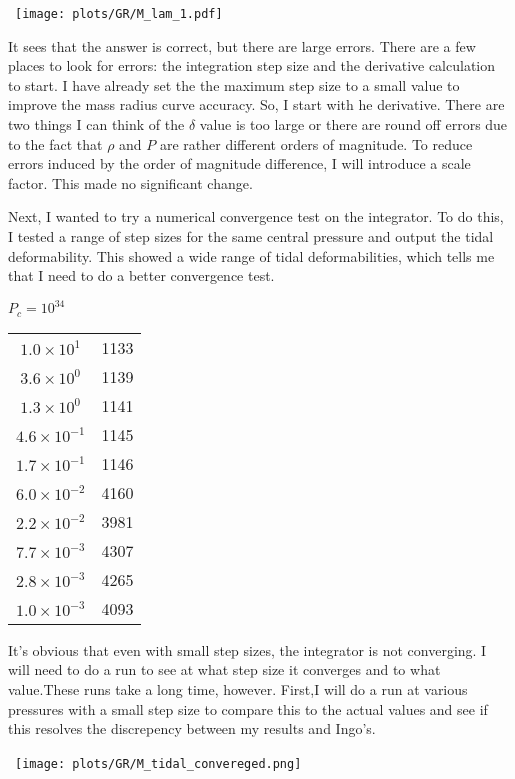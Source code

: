 \documentclass[11pt]{article}
\numberwithin{equation}{section}
\begin{document}
\begin{center}
\hbox{
\texttt{[image: plots/GR/M\_lam\_1.pdf]}}
\end{center}

It sees that the answer is correct, but there are large errors.  There are a few places to look for errors: the integration step size and the derivative calculation to start. I have already set the the maximum step size to a small value to improve the mass radius curve accuracy.  So, I start with he derivative.  There are two things I can think of the $\delta$ value is too large or there are round off errors due to the fact that $\rho$ and $P$ are rather different orders of magnitude.  To reduce errors induced by the order of magnitude difference, I will introduce a scale factor.   This made no significant change.

Next, I wanted to try a numerical convergence test on the integrator.   To do this, I tested a range of step sizes for the same central pressure and output the tidal deformability.  This showed a wide range of tidal deformabilities, which tells me that I need to do a better convergence test.  

$P_{c} = 10^{34}$
\begin{tabular}{|c | c|} \hline
$1.0 \times 10^1$ & 1133 \\ 
$3.6 \times 10^0$ & 1139 \\
$1.3 \times 10^0$ & 1141 \\
$4.6 \times 10^{-1}$ &  1145 \\
$1.7 \times 10^{-1}$ & 1146 \\
$6.0 \times 10^{-2}$ & 4160 \\ 
$2.2 \times 10^{-2}$ & 3981 \\
$7.7 \times 10^{-3}$ & 4307 \\ 
$2.8 \times 10^{-3}$ & 4265 \\
$1.0 \times 10^{-3}$ & 4093  \\
\hline
\end{tabular}

It's obvious that even with small step sizes, the integrator is not converging.  I will need to do a run to see at what step size it converges and to what value.These runs take a long time, however. First,I will do a run at various pressures with a small step size to compare this to the actual values and see if this resolves the discrepency between my results and Ingo's. 


\begin{center}
\hbox{
\texttt{[image: plots/GR/M\_tidal\_convereged.png]}}
\end{center}
 
\end{document}
